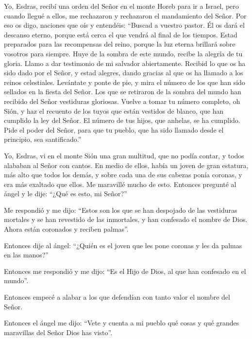  Yo, Esdras, recibí una orden del Señor en el monte Horeb
para ir a Israel, pero cuando llegué a ellos, me rechazaron y rechazaron
el mandamiento del Señor.  Por eso os digo, naciones que
oís y entendéis: ``Buscad a vuestro pastor. Él os dará el descanso
eterno, porque está cerca el que vendrá al final de los tiempos.
 Estad preparados para las recompensas del reino, porque
la luz eterna brillará sobre vosotros para siempre.  Huye
de la sombra de este mundo, recibe la alegría de tu gloria. Llamo a dar
testimonio de mi salvador abiertamente.  Recibid lo que
os ha sido dado por el Señor, y estad alegres, dando gracias al que os
ha llamado a los reinos celestiales.  Levántate y ponte
de pie, y mira el número de los que han sido sellados en la fiesta del
Señor.  Los que se retiraron de la sombra del mundo han
recibido del Señor vestiduras gloriosas.  Vuelve a tomar
tu número completo, oh Sión, y haz el recuento de los tuyos que están
vestidos de blanco, que han cumplido la ley del Señor. 
El número de tus hijos, que anhelas, se ha cumplido. Pide el poder del
Señor, para que tu pueblo, que ha sido llamado desde el principio, sea
santificado.''

 Yo, Esdras, vi en el monte Sión una gran multitud, que
no podía contar, y todos alababan al Señor con cantos. 
En medio de ellos, había un joven de gran estatura, más alto que todos
los demás, y sobre cada una de sus cabezas ponía coronas, y era más
exaltado que ellos. Me maravillé mucho de esto.  Entonces
pregunté al ángel y le dije: ``¿Qué es esto, mi Señor?''

 Me respondió y me dijo: ``Estos son los que se han
despojado de las vestiduras mortales y se han revestido de las
inmortales, y han confesado el nombre de Dios. Ahora están coronados y
reciben palmas''.

 Entonces dije al ángel: ``¿Quién es el joven que les
pone coronas y les da palmas en las manos?''

 Entonces me respondió y me dijo: ``Es el Hijo de Dios,
al que han confesado en el mundo''.

Entonces empecé a alabar a los que defendían con tanto valor el nombre
del Señor.

 Entonces el ángel me dijo: ``Vete y cuenta a mi pueblo
qué cosas y qué grandes maravillas del Señor Dios has visto''.

